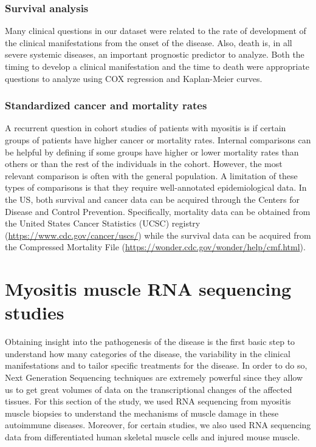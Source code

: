 \subsubsection{Survival analysis}
Many clinical questions in our dataset were related to the rate of development of the clinical manifestations from the onset of the disease. Also, death is, in all severe systemic diseases, an important prognostic predictor to analyze. Both the timing to develop a clinical manifestation and the time to death were appropriate questions to analyze using COX regression and Kaplan-Meier curves.

\subsubsection{Standardized cancer and mortality rates}
A recurrent question in cohort studies of patients with myositis is if certain groups of patients have higher cancer or mortality rates. Internal comparisons can be helpful by defining if some groups have higher or lower mortality rates than others or than the rest of the individuals in the cohort. However, the most relevant comparison is often with the general population. A limitation of these types of comparisons is that they require well-annotated epidemiological data. In the US, both survival and cancer data can be acquired through the Centers for Disease and Control Prevention. Specifically, mortality data can be obtained from the United States Cancer Statistics (UCSC) registry (\url{https://www.cdc.gov/cancer/uscs/}) while the survival data can be acquired from the Compressed Mortality File (\url{https://wonder.cdc.gov/wonder/help/cmf.html}).

\section{Myositis muscle RNA sequencing studies}
Obtaining insight into the pathogenesis of the disease is the first basic step to understand how many categories of the disease, the variability in the clinical manifestations and to tailor specific treatments for the disease. In order to do so, Next Generation Sequencing techniques are extremely powerful since they allow us to get great volumes of data on the transcriptional changes of the affected tissues. For this section of the study, we used RNA sequencing from myositis muscle biopsies to understand the mechanisms of muscle damage in these autoimmune diseases. Moreover, for certain studies, we also used RNA sequencing data from differentiated human skeletal muscle cells and injured mouse muscle.

